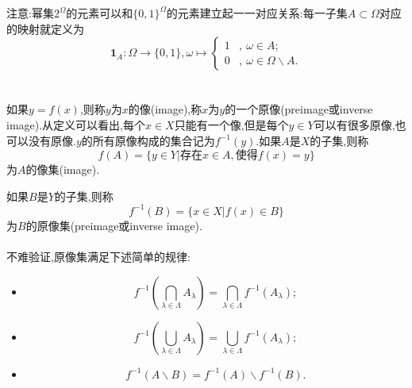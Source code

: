 \begin{frame}
	注意:幂集$2^\Omega$的元素可以和$\{0,1\}^\Omega$的元素建立起一一对应关系:每一子集$A\subset \Omega$对应的映射就定义为\begin{equation}
		\bm{1}_A:\Omega\rightarrow \{0,1\},\omega\mapsto\left\{
		\begin{aligned}
		1 &,~\omega\in A ;\\
		0  &,~\omega\in \Omega\backslash A.
		\end{aligned}
		\right.
	\end{equation}
		\\ \hspace*{\fill} \\%
	如果$y=f(x)$,则称$y$为$x$的\alert{像}(image),称$x$为$y$的一个\alert{原像}(preimage或inverse image).从定义可以看出,每个$x\in X$只能有一个像,但是每个$y\in Y$可以有很多原像,也可以没有原像.$y$的所有原像构成的集合记为$f^{-1}(y)$.如果$A$是$X$的子集,则称\begin{equation}
		f(A) = \{y\in Y|\text{存在} x\in A,\text{使得}f(x)=y\}
	\end{equation}
	为$A$的\alert{像集}(image).
\end{frame}

\begin{frame}
	如果$B$是$Y$的子集,则称\begin{equation}
		f^{-1}(B) = \{x\in X|f(x)\in B\}
	\end{equation}
	为$B$的\alert{原像集}(preimage或inverse image).
		\\ \hspace*{\fill} \\%
	不难验证,原像集满足下述简单的规律:
	\begin{itemize}
		\item \begin{equation}
			f^{-1}\left(\bigcap_{\lambda\in\Lambda}A_{\lambda} \right) = \bigcap_{\lambda\in\Lambda}f^{-1}\left(A_{\lambda}\right);
		\end{equation}
		\item \begin{equation}
			f^{-1}\left(\bigcup_{\lambda\in\Lambda}A_{\lambda} \right) = \bigcup_{\lambda\in\Lambda}f^{-1}\left(A_{\lambda}\right);
		\end{equation}
		\item \begin{equation}
			f^{-1}(A\backslash B) = f^{-1}(A) \backslash f^{-1}(B).
		\end{equation}
	\end{itemize}
\end{frame}

